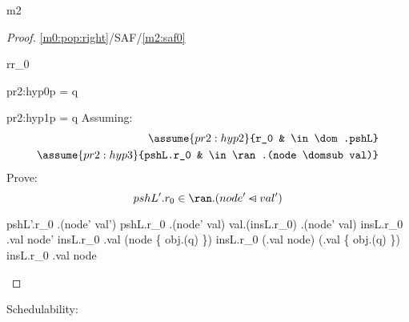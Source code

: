 \documentclass[12pt]{amsart}
\begin{document}
\begin{machine}{m2}
\begin{proof}{\ref{m0:pop:right}/SAF/\ref{m2:saf0}}
\begin{free:var}{r}{r_0}
\begin{by:cases}
\begin{case}{pr2:hyp0}{p = q}
	\easy
\end{case}
\begin{case}{pr2:hyp1}{\neg p = q}
	Assuming:
	\begin{align*}
		\assume{pr2:hyp2}{r_0 & \in \dom.pshL}
	\\  \assume{pr2:hyp3}{pshL.r_0 & \in \ran.(node \domsub val)}
	\end{align*}
	Prove:
	\[ \goal{pshL'.r_0 \in \ran.(node' \domsub val')} \]
	\begin{calculation}
		pshL'.r_0 \in \ran.(node' \domsub val')
		pshL.r_0 \in \ran.(node' \domsub val)
		val.(insL.r_0) \in \ran.(node' \domsub val)
		insL.r_0 \in \dom.val \setminus node'
	\hint{=}{ \eqref{m2:a1} }
		insL.r_0 \in \dom.val \setminus (node \setminus \{ obj.(q) \})
	\hint{=}{  }
		insL.r_0 \in (\dom.val \setminus node) \bunion (\dom.val \binter \{ obj.(q) \})
	\hint{\follows}{  }
		insL.r_0 \in \dom.val \setminus node
		\true
	\end{calculation}
\end{case}
\end{by:cases}
\end{free:var}
\end{proof}

Schedulability:
\begin{align*}
\end{align*}
\begin{align*}
\end{align*}


\end{machine}
\end{document}
